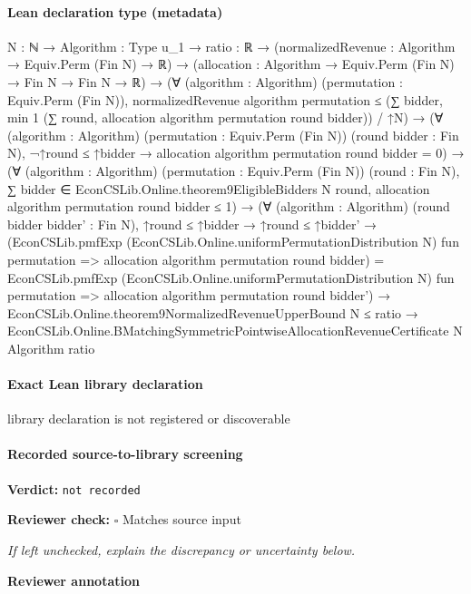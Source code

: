 \documentclass[10pt]{article}
\newcommand{\reviewerbox}{%
  \par\noindent\fbox{\parbox{0.96\linewidth}{\rule{0pt}{0.38in}}}\par
}
\newcommand{\reviewmatch}[1]{%
  \par\noindent\textbf{Reviewer check:} $\square$\; #1\par
  \noindent\emph{If left unchecked, explain the discrepancy or uncertainty below.}\par
}
\begin{document}
\paragraph{Lean declaration type (metadata)}
\begin{ReviewVerbatim}
{N : ℕ} →
  {Algorithm : Type u_1} →
    {ratio : ℝ} →
      (normalizedRevenue : Algorithm → Equiv.Perm (Fin N) → ℝ) →
        (allocation : Algorithm → Equiv.Perm (Fin N) → Fin N → Fin N → ℝ) →
          (∀ (algorithm : Algorithm) (permutation : Equiv.Perm (Fin N)),
              normalizedRevenue algorithm permutation ≤
                (∑ bidder, min 1 (∑ round, allocation algorithm permutation round bidder)) / ↑N) →
            (∀ (algorithm : Algorithm) (permutation : Equiv.Perm (Fin N)) (round bidder : Fin N),
                ¬↑round ≤ ↑bidder → allocation algorithm permutation round bidder = 0) →
              (∀ (algorithm : Algorithm) (permutation : Equiv.Perm (Fin N)) (round : Fin N),
                  ∑ bidder ∈ EconCSLib.Online.theorem9EligibleBidders N round,
                      allocation algorithm permutation round bidder ≤
                    1) →
                (∀ (algorithm : Algorithm) (round bidder bidder' : Fin N),
                    ↑round ≤ ↑bidder →
                      ↑round ≤ ↑bidder' →
                        (EconCSLib.pmfExp (EconCSLib.Online.uniformPermutationDistribution N) fun permutation =>
                            allocation algorithm permutation round bidder) =
                          EconCSLib.pmfExp (EconCSLib.Online.uniformPermutationDistribution N) fun permutation =>
                            allocation algorithm permutation round bidder') →
                  EconCSLib.Online.theorem9NormalizedRevenueUpperBound N ≤ ratio →
                    EconCSLib.Online.BMatchingSymmetricPointwiseAllocationRevenueCertificate N Algorithm ratio
\end{ReviewVerbatim}

\paragraph{Exact Lean library declaration}
\begin{ReviewVerbatim}
library declaration is not registered or discoverable
\end{ReviewVerbatim}

\paragraph{Recorded source-to-library screening}
\textbf{Verdict:} \texttt{not recorded}
\reviewmatch{Matches source input}
\noindent\textbf{Reviewer annotation}\par
\reviewerbox
\clearpage
\hypertarget{library-prerequisite-556bebda47130c54}{}
\end{document}
